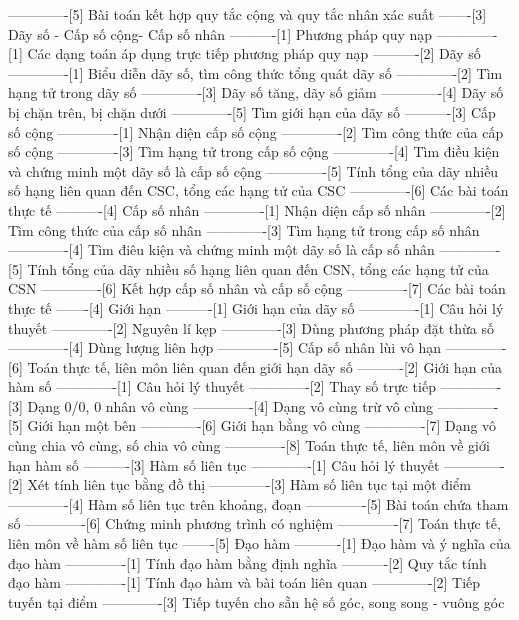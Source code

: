 -------------[5] Bài toán kết hợp quy tắc cộng và quy tắc nhân xác suất
-------[3] Dãy số - Cấp số cộng- Cấp số nhân
----------[1] Phương pháp quy nạp
-------------[1] Các dạng toán áp dụng trực tiếp phương pháp quy nạp
----------[2] Dãy số
-------------[1] Biểu diễn dãy số, tìm công thức tổng quát dãy số
-------------[2] Tìm hạng tử trong dãy số
-------------[3] Dãy số tăng, dãy số giảm
-------------[4] Dãy số bị chặn trên, bị chặn dưới
-------------[5] Tìm giới hạn của dãy số
----------[3] Cấp số cộng
-------------[1] Nhận diện cấp số cộng
-------------[2] Tìm công thức của cấp số cộng
-------------[3] Tìm hạng tử trong cấp số cộng
-------------[4] Tìm điều kiện và chứng minh một dãy số là cấp số cộng
-------------[5] Tính tổng của dãy nhiều số hạng liên quan đến CSC, tổng các hạng tử của CSC
-------------[6] Các bài toán thực tế
----------[4] Cấp số nhân
-------------[1] Nhận diện cấp số nhân
-------------[2] Tìm công thức của cấp số nhân
-------------[3] Tìm hạng tử trong cấp số nhân
-------------[4] Tìm điêu kiện và chứng minh một dãy số là cấp số nhân
-------------[5] Tính tổng của dãy nhiều số hạng liên quan đến CSN, tổng các hạng tử của CSN
-------------[6] Kết hợp cấp số nhân và cấp số cộng
-------------[7] Các bài toán thực tế
-------[4] Giới hạn
----------[1] Giới hạn của dãy số
-------------[1] Câu hỏi lý thuyết
-------------[2] Nguyên lí kẹp
-------------[3] Dùng phương pháp đặt thừa số
-------------[4] Dùng lượng liên hợp
-------------[5] Cấp số nhân lùi vô hạn
-------------[6] Toán thực tế, liên môn liên quan đến giới hạn dãy số
----------[2] Giới hạn của hàm số
-------------[1] Câu hỏi lý thuyết
-------------[2] Thay số trực tiếp
-------------[3] Dạng 0/0, 0 nhân vô cùng
-------------[4] Dạng vô cùng trừ vô cùng
-------------[5] Giới hạn một bên
-------------[6] Giới hạn bằng vô cùng
-------------[7] Dạng vô cùng chia vô cùng, số chia vô cùng
-------------[8] Toán thực tế, liên môn về giới hạn hàm số
----------[3] Hàm số liên tục
-------------[1] Câu hỏi lý thuyết
-------------[2] Xét tính liên tục bằng đồ thị
-------------[3] Hàm số liên tục tại một điểm
-------------[4] Hàm số liên tục trên khoảng, đoạn
-------------[5] Bài toán chứa tham số
-------------[6] Chứng minh phương trình có nghiệm
-------------[7] Toán thực tế, liên môn về hàm số liên tục
-------[5] Đạo hàm
----------[1] Đạo hàm và ý nghĩa của đạo hàm
-------------[1] Tính đạo hàm bằng định nghĩa
----------[2] Quy tắc tính đạo hàm
-------------[1] Tính đạo hàm và bài toán liên quan
-------------[2] Tiếp tuyến tại điểm
-------------[3] Tiếp tuyến cho sẵn hệ số góc, song song - vuông góc
